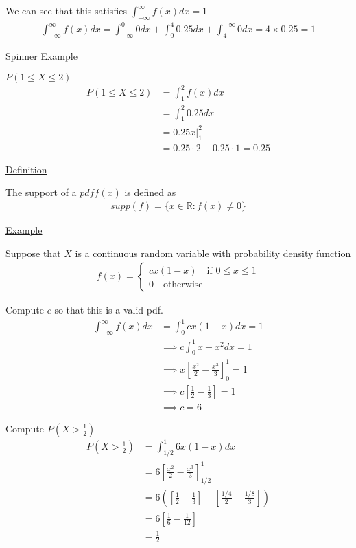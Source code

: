 \documentclass{article}
\begin{document}
We can see that this satisfies $\int_{-\infty}^{\infty}f(x)dx = 1$
\begin{align*}
    \int_{-\infty}^{\infty} f(x)dx = \int_{-\infty}^0 0dx + \int_0^4 0.25dx + \int_4^{+\infty}0dx = 4 \times 0.25 = 1
\end{align*}

Spinner Example

$P(1 \le X \le 2)$
\begin{align*}
    P(1 \le X \le 2) &= \int_1^2f(x)dx \\
    &= \int_1^2 0.25dx \\
    &= 0.25x\vert_1^2 \\
    &= 0.25 \cdot 2 - 0.25 \cdot 1 = 0.25
\end{align*}

\underline{Definition}

The support of a $pdf f(x)$ is defined as
\begin{align*}
    supp(f) = \{x \in \mathbb{R}: f(x) \ne 0\}
\end{align*}

\underline{Example}

Suppose that $X$ is a continuous random variable with probability density function
\begin{align*}
    f(x) = \begin{cases}
        cx(1-x) \quad \text{if } 0 \le x \le 1\\
        0 \quad \text{otherwise}
    \end{cases}
\end{align*}

Compute $c$ so that this is a valid pdf. 
\begin{align*}
    \int_{-\infty}^{\infty}f(x)dx &= \int_0^1 cx(1-x)dx = 1 \\
    &\implies c \int_0^1 x - x^2dx = 1 \\
    &\implies x\left[\frac{x^2}{2}-\frac{x^3}{3}\right]_0^1 = 1\\
    &\implies c\left[\frac{1}{2} - \frac{1}{3}\right] = 1 \\
    &\implies c = 6
\end{align*}

Compute $P(X > \frac{1}{2})$
\begin{align*}
    P(X > \frac{1}{2}) &= \int_{1/2}^1 6x(1-x)dx \\
    &= 6\left[\frac{x^2}{2} - \frac{x^3}{3}\right]_{1/2}^1 \\
    &= 6\left(\left[\frac{1}{2} - \frac{1}{3}\right] - \left[\frac{1/4}{2} - \frac{1/8}{3}\right]\right) \\
    &= 6\left[\frac{1}{6} - \frac{1}{12}\right] \\
    &= \frac{1}{2}
\end{align*}
\end{document}
